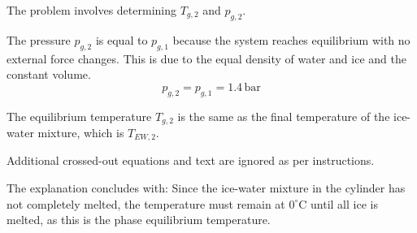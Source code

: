 The problem involves determining \( T_{g,2} \) and \( p_{g,2} \).  

The pressure \( p_{g,2} \) is equal to \( p_{g,1} \) because the system reaches equilibrium with no external force changes. This is due to the equal density of water and ice and the constant volume.  
\[
p_{g,2} = p_{g,1} = 1.4 \, \text{bar}
\]  

The equilibrium temperature \( T_{g,2} \) is the same as the final temperature of the ice-water mixture, which is \( T_{EW,2} \).  

Additional crossed-out equations and text are ignored as per instructions.  

The explanation concludes with:  
Since the ice-water mixture in the cylinder has not completely melted, the temperature must remain at \( 0^\circ\text{C} \) until all ice is melted, as this is the phase equilibrium temperature.